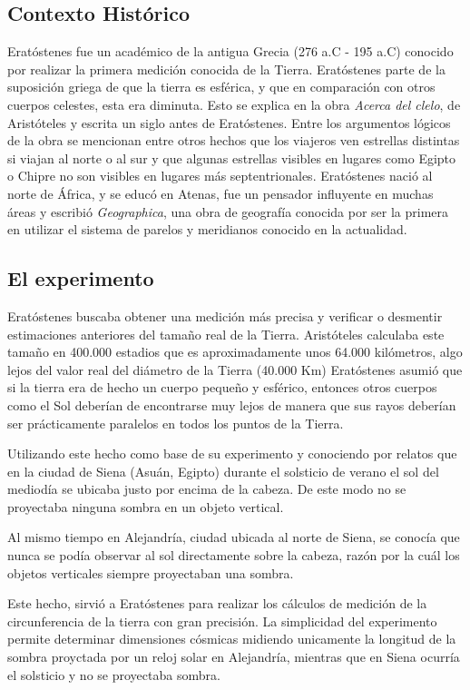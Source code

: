 \documentclass[journal]{IEEEtran}
\begin{document}
\subsection{Contexto Histórico}
Eratóstenes fue un académico de la antigua Grecia (276 a.C - 195 a.C) conocido por realizar la primera medición conocida
de la Tierra. Eratóstenes parte de la suposición griega de que la tierra es esférica,
y que en comparación con otros cuerpos celestes,
esta era diminuta. Esto se explica en la obra \emph{Acerca del clelo},
de Aristóteles y escrita un siglo antes de Eratóstenes.
Entre los argumentos lógicos de la obra se mencionan entre otros hechos que los viajeros ven 
estrellas distintas si viajan al norte o al sur y que algunas estrellas visibles en lugares como Egipto o Chipre no son visibles en lugares más 
septentrionales.
Eratóstenes nació al norte de África, y se educó en Atenas, fue un pensador influyente en muchas áreas y escribió \emph{Geographica}, una obra de 
geografía conocida por ser la primera en utilizar el sistema de parelos y meridianos conocido en la actualidad.

\subsection{El experimento}
Eratóstenes buscaba obtener una medición más precisa y verificar o desmentir estimaciones anteriores del tamaño real de la Tierra.
Aristóteles calculaba este tamaño en 400.000 estadios que es aproximadamente unos 64.000 kilómetros, algo lejos del valor real del diámetro de la Tierra (40.000 Km)
Eratóstenes asumió que si la tierra era de hecho un cuerpo pequeño y esférico, entonces otros cuerpos como el Sol deberían de encontrarse muy lejos  de manera que sus rayos
deberían ser prácticamente paralelos en todos los puntos de la Tierra.

Utilizando este hecho como base de su experimento y 
conociendo por relatos que en la ciudad de Siena (Asuán, Egipto)
durante el solsticio de verano el sol del mediodía se ubicaba justo por encima de la cabeza. De este modo
no se proyectaba ninguna sombra en un objeto vertical.

Al mismo tiempo en Alejandría, ciudad ubicada al norte de Siena, se conocía que nunca se podía observar al sol 
directamente sobre la cabeza, razón por la cuál los objetos verticales siempre proyectaban una sombra.

Este hecho, sirvió a Eratóstenes para realizar los cálculos de medición de la circunferencia de la tierra con gran precisión.
La simplicidad del experimento permite determinar dimensiones cósmicas midiendo unicamente la longitud de la sombra proyctada por 
un reloj solar en Alejandría, mientras que en Siena ocurría el solsticio y no se proyectaba sombra.
\end{document}
